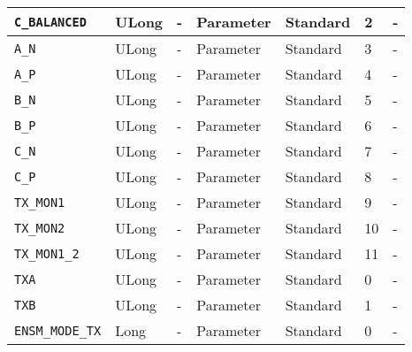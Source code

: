 \documentclass{article}
\begin{document}
\begin{landscape}
\begin{scriptsize}
\begin{longtable}{|p{3.6cm}|p{8.1cm}|p{1.4cm}|p{1.3cm}|p{1.4cm}|p{2.5cm}|p{3.6cm}|}
			\hline
      \verb+C_BALANCED+                & ULong        & -               & Parameter             & Standard                         & 2                   & - \\
			\hline
      \verb+A_N+                       & ULong        & -               & Parameter             & Standard                         & 3                   & - \\
			\hline
      \verb+A_P+                       & ULong        & -               & Parameter             & Standard                         & 4                   & - \\
			\hline
      \verb+B_N+                       & ULong        & -               & Parameter             & Standard                         & 5                   & - \\
			\hline
      \verb+B_P+                       & ULong        & -               & Parameter             & Standard                         & 6                   & - \\
			\hline
      \verb+C_N+                       & ULong        & -               & Parameter             & Standard                         & 7                   & - \\
			\hline
      \verb+C_P+                       & ULong        & -               & Parameter             & Standard                         & 8                   & - \\
			\hline
      \verb+TX_MON1+                   & ULong        & -               & Parameter             & Standard                         & 9                   & - \\
			\hline
      \verb+TX_MON2+                   & ULong        & -               & Parameter             & Standard                         & 10                  & - \\
			\hline
      \verb+TX_MON1_2+                 & ULong        & -               & Parameter             & Standard                         & 11                  & - \\
			\hline
      \verb+TXA+                       & ULong        & -               & Parameter             & Standard                         & 0                   & - \\
			\hline
      \verb+TXB+                       & ULong        & -               & Parameter             & Standard                         & 1                   & - \\
			\hline
      \verb+ENSM_MODE_TX+              & Long         & -               & Parameter             & Standard                         & 0                   & - \\

\end{longtable}
\end{scriptsize}
\end{landscape}
\end{document}
